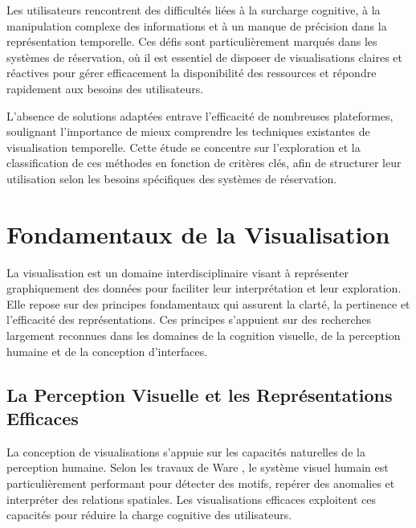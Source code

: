 \documentclass[runningheads]{llncs}
\begin{document}
Les utilisateurs rencontrent des difficultés liées à la surcharge cognitive, à la manipulation complexe des informations et à un manque de précision dans la représentation temporelle. Ces défis sont particulièrement marqués dans les systèmes de réservation, où il est essentiel de disposer de visualisations claires et réactives pour gérer efficacement la disponibilité des ressources et répondre rapidement aux besoins des utilisateurs.

L'absence de solutions adaptées entrave l’efficacité de nombreuses plateformes, soulignant l'importance de mieux comprendre les techniques existantes de visualisation temporelle. Cette étude se concentre sur l’exploration et la classification de ces méthodes en fonction de critères clés, afin de structurer leur utilisation selon les besoins spécifiques des systèmes de réservation.

\section{Fondamentaux de la Visualisation}

La visualisation est un domaine interdisciplinaire visant à représenter graphiquement des données pour faciliter leur interprétation et leur exploration. Elle repose sur des principes fondamentaux qui assurent la clarté, la pertinence et l'efficacité des représentations. Ces principes s’appuient sur des recherches largement reconnues dans les domaines de la cognition visuelle, de la perception humaine et de la conception d’interfaces.

\subsection{La Perception Visuelle et les Représentations Efficaces}
La conception de visualisations s’appuie sur les capacités naturelles de la perception humaine. Selon les travaux de Ware \cite{ware_information_2012}, le système visuel humain est particulièrement performant pour détecter des motifs, repérer des anomalies et interpréter des relations spatiales. Les visualisations efficaces exploitent ces capacités pour réduire la charge cognitive des utilisateurs.
\end{document}
